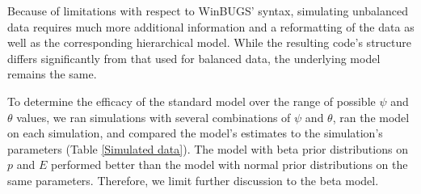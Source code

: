 \documentclass[12pt]{article}
\begin{document}
    Because of limitations with respect to WinBUGS' syntax, simulating
    unbalanced data requires much more additional information and a reformatting
    of the data as well as the corresponding hierarchical model. While the
    resulting code's structure differs significantly from that used for balanced
    data, the underlying model remains the same.

    To determine the efficacy of the standard model over the range of possible
    \(\psi\) and \(\theta\) values, we ran simulations with several combinations
    of \(\psi\) and \(\theta\), ran the model on each simulation, and compared
    the model's estimates to the simulation's parameters (Table \ref{Simulated
    data}). The model with beta
    prior distributions on \(p\) and \(E\) performed better than the model with
    normal prior distributions on the same parameters.  Therefore, we limit
    further discussion to the beta model.
\end{document}
